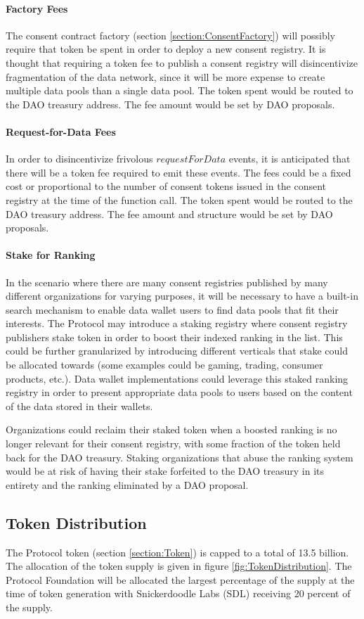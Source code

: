 \paragraph{Factory Fees}
The consent contract factory (section \ref{section:ConsentFactory}) will possibly require that token be spent in order to deploy a new consent registry. It is thought that requiring a token fee to publish a consent registry will disincentivize fragmentation of the data network, since it will be more expense to create multiple data pools than a single data pool. The token spent would be routed to the DAO treasury address. The fee amount would be set by DAO proposals. 

\paragraph{Request-for-Data Fees}
In order to disincentivize frivolous $requestForData$ events, it is anticipated that there will be a token fee
required to emit these events. The fees could be a fixed cost or proportional to the number of consent tokens
issued in the consent registry at the time of the function call. The token spent would be routed to the DAO treasury address. The fee amount and structure would be set by DAO proposals. 

\paragraph{Stake for Ranking}

In the scenario where there are many consent registries published by many different organizations for varying purposes, it will be necessary to have a built-in search mechanism to enable data wallet users to find data pools that fit their interests. The Protocol may introduce a staking registry where consent registry
publishers stake token in order to boost their indexed ranking in the list. This could be further granularized by introducing different verticals that stake could be allocated towards (some examples could be gaming, trading, consumer products, etc.). Data wallet implementations could leverage this staked ranking registry in order to present appropriate data pools to users based on the content of the data stored in their wallets. 

Organizations could reclaim their staked token when a boosted ranking is no longer relevant for their consent registry, with some fraction of the token held back for the DAO treasury. Staking organizations that abuse the ranking system would be at risk of having their stake forfeited to the DAO treasury in its entirety and the ranking eliminated by a DAO proposal. 

\subsection{Token Distribution}

The Protocol token (section \ref{section:Token}) is capped to a total of 13.5 billion. The allocation of the token supply is given in figure \ref{fig:TokenDistribution}. The Protocol Foundation will be allocated the largest percentage of the supply at the time of token generation with Snickerdoodle Labs (SDL) receiving 20 percent of the supply.